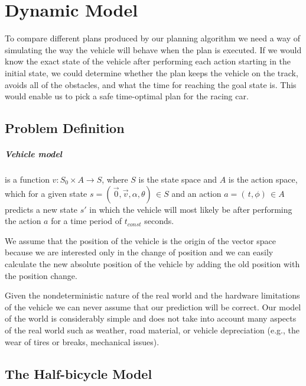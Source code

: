 \chapter{Dynamic Model}

To compare different plans produced by our planning algorithm we need a way of simulating the way the vehicle will behave when the plan is executed. If we would know the exact state of the vehicle after performing each action starting in the initial state, we could determine whether the plan keeps the vehicle on the track, avoids all of the obstacles, and what the time for reaching the goal state is. This would enable us to pick a safe time-optimal plan for the racing car.

\section{Problem Definition}

\paragraph{Vehicle model} is a function $v: S_{0} \times A \rightarrow S$, where $S$ is the state space and $A$ is the action space, which for a given state $s = ( \, \vec{0}, \vec{v}, \alpha, \theta ) \, \in S$ and an action $a = ( \, t, \phi ) \, \in A$ predicts a new state $s\prime$ in which the vehicle will most likely be after performing the action $a$ for a time period of $t_{const}$ seconds.

We assume that the position of the vehicle is the origin of the vector space because we are interested only in the change of position and we can easily calculate the new absolute position of the vehicle by adding the old position with the position change.

Given the nondeterministic nature of the real world and the hardware limitations of the vehicle we can never assume that our prediction will be correct. Our model of the world is considerably simple and does not take into account many aspects of the real world such as weather, road material, or vehicle depreciation (e.g., the wear of tires or breaks, mechanical issues). 


\section{The Half-bicycle Model}

